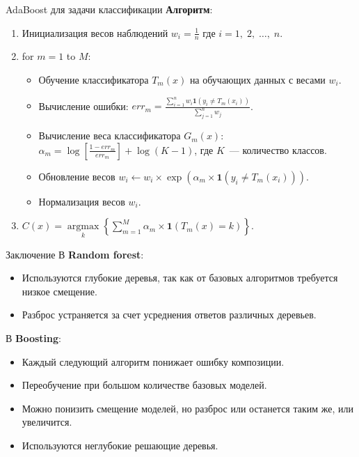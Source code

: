 \documentclass[notheorems, handout]{beamer}
\begin{document}
\begin{frame}{AdaBoost для задачи классификации}
\textbf{Алгоритм}:
\begin{enumerate}
	\item Инициализация весов наблюдений $w_{i} = \frac{1}{n}$
где $i = 1,\; 2,\; \dots,\; n$.
	\item for $m = 1$ to $M$:
		\begin{itemize}
			\item Обучение классификатора $T_{m}(x)$ на обучающих данных с весами $w_{i}$.
			\item Вычисление ошибки: $err_{m} = \frac{\sum_{i = 1}^{n}w_{i} \mathbf{1}\left(y_{i} \neq T_{m}(x_{i})\right)}{\sum_{j = 1}^{n}w_{j}}$.
			\item Вычисление веса классификатора $G_{m}(x)$: $\alpha_{m} = \log \left[\frac{1 - err_{m}}{err_{m}} \right] + \log(K - 1)$, где $K$~--- количество классов.
			\item Обновление весов $w_{i} \gets w_{i} \times \exp(\alpha_{m} 	\times \mathbf{1}(y_{i} \neq T_{m}(x_{i})))$.
			\item Нормализация весов $w_{i}$.
		\end{itemize}
	\item $C(x) = \underset{k}{\operatorname{argmax}}\left\{\displaystyle\sum_{m = 1}^{M}\alpha_{m} \times \mathbf{1}(T_{m}(x) = k)\right\}$.
\end{enumerate}
\end{frame}

\begin{frame}{Заключение}
В \textbf{Random forest}:
\begin{itemize}
	\item Используются глубокие деревья, так как от базовых алгоритмов требуется низкое смещение.
	\item Разброс устраняется за счет усреднения ответов различных деревьев.
\end{itemize}
\par\smallskip
В \textbf{Boosting}:
\begin{itemize}
	\item Каждый следующий алгоритм понижает ошибку композиции.
	\item Переобучение при большом количестве базовых моделей.
	\item Можно понизить смещение моделей, но разброс или останется таким же, или увеличится.
	\item Используются неглубокие решающие деревья.
\end{itemize}
\end{frame}
\end{document}
